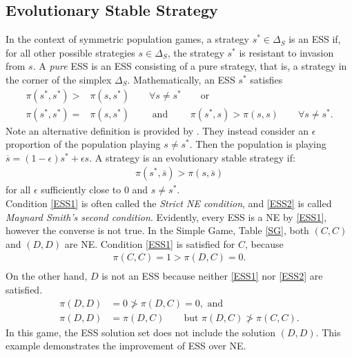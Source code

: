 \subsection{Evolutionary Stable Strategy}
In the context of symmetric population games, a strategy $s^* \in \Delta_S$ is an ESS if, for all other possible strategies $s \in \Delta_S$, the strategy $s^*$ is resistant to invasion from $s$. A \emph{pure} ESS is an ESS consisting of a pure strategy, that is, a strategy in the corner of the simplex $\Delta_S$. Mathematically, an ESS  $s^*$ satisfies 
\begin{align}
    \pi(s^*,s^*) >& \pi(s, s^*) \qquad \forall s \neq s^* \qquad \text{or} \label{ESS1}\\
    \pi(s^*, s^*) =& \pi(s, s^*) \qquad \text{     and      } \qquad \pi(s^*, s) > \pi(s,s) \qquad \forall s \neq s^*. \label{ESS2} 
\end{align}
Note an alternative definition is provided by \cite{RN80}. They instead consider an $\epsilon$ proportion of the population playing $s \neq s^*$. Then the population is playing $\overline{s} = (1-\epsilon)s^* + \epsilon s $. A strategy is an evolutionary stable strategy if: \\
\begin{align*}
    \pi(s^*, \overline{s}) > \pi(s, \overline{s})
\end{align*}
for all $\epsilon$ sufficiently close to 0 and $s \neq s^*$. \\

Condition \eqref{ESS1} is often called the \emph{Strict NE condition}, and \eqref{ESS2} is called \emph{Maynard Smith's second condition}. Evidently, every ESS is a NE by \eqref{ESS1}, however the converse is not true. In the Simple Game, Table \ref{SG}, both $(C,C)$ and $(D,D)$ are NE. Condition \eqref{ESS1} is satisfied for $C$, because \\
\begin{align*}
    \pi(C,C) = 1 > \pi(D,C) = 0. \\
\end{align*}
On the other hand, $D$ is not an ESS because neither \eqref{ESS1} nor \eqref{ESS2} are satisfied. \\
\begin{align*}
    \pi(D,D) &= 0 \ngtr \pi(D,C) = 0, \text{ and}\\
    \pi(D,D) &= \pi(D,C) \qquad \text{but } \pi(D,C) \ngtr \pi(C,C).
\end{align*}
In this game, the ESS solution set does not include the  solution $(D,D)$. This example demonstrates the improvement of ESS over NE. \\


